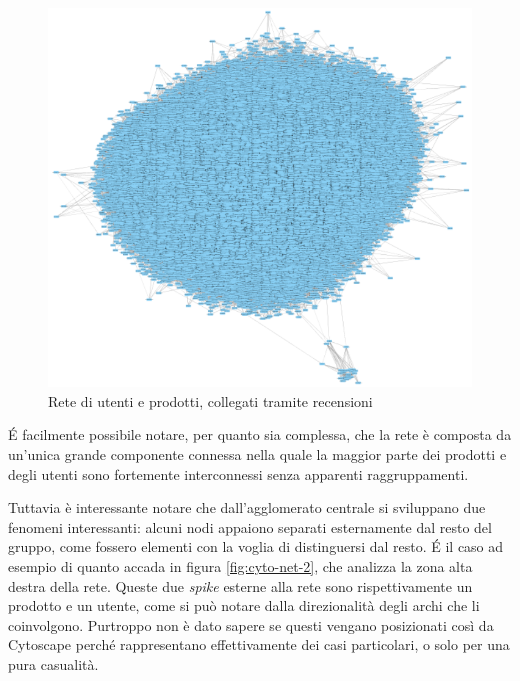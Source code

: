 \documentclass[hidelinks, 12pt]{article}
\begin{document}
\begin{figure}[H]
	\centering
	\includegraphics[scale=0.9]{images/03_01_cyto_net_1.png}
	\caption[Rete di utenti e prodotti, collegati tramite recensioni]{Rete di utenti e prodotti, collegati tramite recensioni}
	\label{fig:cyto-net-1}
\end{figure}

É facilmente possibile notare, per quanto sia complessa, che la rete è composta da un'unica grande componente connessa nella quale la maggior parte dei prodotti e degli utenti sono fortemente interconnessi senza apparenti raggruppamenti.

Tuttavia è interessante notare che dall'agglomerato centrale si sviluppano due fenomeni interessanti: alcuni nodi appaiono separati esternamente dal resto del gruppo, come fossero elementi con la voglia di distinguersi dal resto. É il caso ad esempio di quanto accada in figura \ref{fig:cyto-net-2}, che analizza la zona alta destra della rete. Queste due \textit{spike} esterne alla rete sono rispettivamente un prodotto e un utente, come si può notare dalla direzionalità degli archi che li coinvolgono. Purtroppo non è dato sapere se questi vengano posizionati così da Cytoscape perché rappresentano effettivamente dei casi particolari, o solo per una pura casualità.
\end{document}
